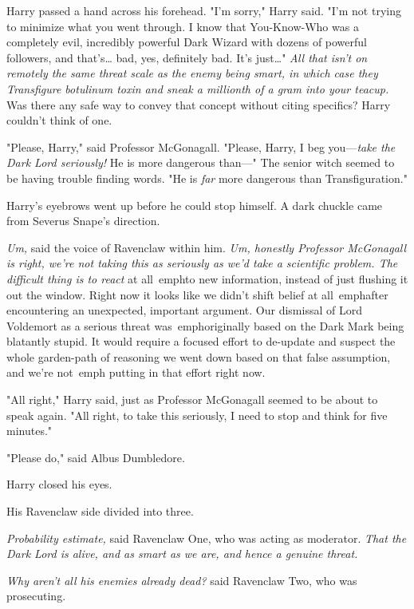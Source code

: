 Harry passed a hand across his forehead. "I'm sorry," Harry said. "I'm not 
trying to minimize what you went through. I know that You-Know-Who was a 
completely evil, incredibly powerful Dark Wizard with dozens of powerful 
followers, and that's{\ldots} bad, yes, definitely bad. It's just{\ldots}" 
\emph{All that isn't on remotely the same threat scale as the enemy being 
smart, in which case they Transfigure botulinum toxin and sneak a millionth of 
a gram into your teacup.} Was there any safe way to convey that concept without 
citing specifics? Harry couldn't think of one.

"Please, Harry," said Professor McGonagall. "Please, Harry, I beg 
you---\emph{take the Dark Lord seriously!} He is more dangerous than---" The 
senior witch seemed to be having trouble finding words. "He is \emph{far} more 
dangerous than Transfiguration."

Harry's eyebrows went up before he could stop himself. A dark chuckle came from 
Severus Snape's direction.

\emph{Um,} said the voice of Ravenclaw within him. \emph{Um, honestly Professor 
McGonagall is right, we're not taking this as seriously as we'd take a 
scientific problem. The difficult thing is to react} at all\ emph{to new 
information, instead of just flushing it out the window. Right now it looks 
like we didn't shift belief} at all\ emph{after encountering an unexpected, 
important argument. Our dismissal of Lord Voldemort as a serious threat} 
was\ emph{originally based on the Dark Mark being blatantly stupid. It would 
require a focused effort to de-update and suspect the whole garden-path of 
reasoning we went down based on that false assumption, and we're} not\ emph{
putting in that effort right now.}

"All right," Harry said, just as Professor McGonagall seemed to be about to 
speak again. "All right, to take this seriously, I need to stop and think for 
five minutes."

"Please do," said Albus Dumbledore.

Harry closed his eyes.

His Ravenclaw side divided into three.

\emph{Probability estimate,} said Ravenclaw One, who was acting as moderator. 
\emph{That the Dark Lord is alive, and as smart as we are, and hence a genuine 
threat.}

\emph{Why aren't all his enemies already dead?} said Ravenclaw Two, who was 
prosecuting.

